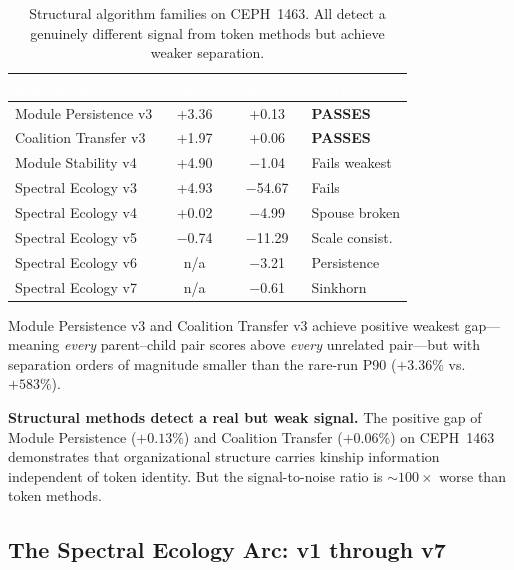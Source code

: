 \documentclass{../yalumba}
\begin{document}
\begin{table}[H]
  \centering
  \tablestyle
  \caption{Structural algorithm families on CEPH~1463.  All detect a
    genuinely different signal from token methods but achieve weaker
    separation.}
  \label{tab:structural_methods}
  \begin{tabular}{lccl}
    \toprule
    \rowcolor{table-header}
    \textcolor{white}{\textbf{Algorithm}} &
    \textcolor{white}{\textbf{Sep (\%)}} &
    \textcolor{white}{\textbf{Gap (\%)}} &
    \textcolor{white}{\textbf{Status}} \\
    \midrule
    Module Persistence v3 & +3.36 & +0.13 & \textbf{PASSES} \\
    Coalition Transfer v3 & +1.97 & +0.06 & \textbf{PASSES} \\
    Module Stability v4 & +4.90 & $-$1.04 & Fails weakest \\
    Spectral Ecology v3 & +4.93 & $-$54.67 & Fails \\
    Spectral Ecology v4 & +0.02 & $-$4.99 & Spouse broken \\
    Spectral Ecology v5 & $-$0.74 & $-$11.29 & Scale consist. \\
    Spectral Ecology v6 & n/a & $-$3.21 & Persistence \\
    Spectral Ecology v7 & n/a & $-$0.61 & Sinkhorn \\
    \bottomrule
  \end{tabular}
\end{table}

Module Persistence v3 and Coalition Transfer v3 achieve positive
weakest gap---meaning \emph{every} parent--child pair scores above
\emph{every} unrelated pair---but with separation orders of magnitude
smaller than the rare-run P90 ($+3.36\%$ vs.\ $+583\%$).

\begin{keyfinding}
\textbf{Structural methods detect a real but weak signal.}  The positive
gap of Module Persistence ($+0.13\%$) and Coalition Transfer ($+0.06\%$)
on CEPH~1463 demonstrates that organizational structure carries kinship
information independent of token identity.  But the signal-to-noise
ratio is ${\sim}100\times$ worse than token methods.
\end{keyfinding}

\subsection{The Spectral Ecology Arc: v1 through v7}
\label{sec:trajectory:arc}
\end{document}
